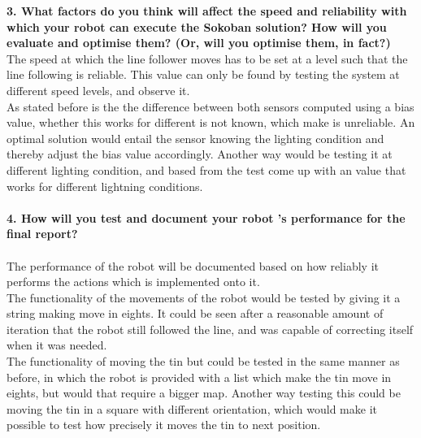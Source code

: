 \documentclass[10pt,a4paper]{article}
\begin{document}
\textbf{3.  What factors do you think will affect the speed and reliability with which your
     robot can execute the Sokoban solution?  How will you evaluate and optimise them?
     (Or, will you optimise them, in fact?)}\\
     

		The speed at which the line follower moves has to be set at a level such that the line following is reliable.   This value can only be found by testing the system at different speed levels, and observe it.\\
		
		As stated before is the the difference between both sensors computed using a bias value, whether this works for different is not known, which make is unreliable. An optimal solution would entail the sensor knowing the lighting condition and thereby adjust  the bias value accordingly.  Another way would be testing it at different lighting condition, and based from the test come up with an value that works for different lightning conditions. \\\\
		\textbf{4.  How will you test and document your robot
		's performance for the final report?}\\\\

The performance of the robot will be documented based on how reliably it performs the actions which is implemented onto it. \\


	The  functionality of the movements of the robot would be tested by giving it a string making move in eights.   It could be seen after a reasonable amount of iteration that the robot still followed the line, and was capable of correcting itself when   it was needed. \\
	
	The functionality of moving the tin but could be tested in the same manner as before, in which the robot is provided with a list which make the tin move in eights,  but would that require a bigger map. Another way testing this could be moving the tin in a square with different orientation, which would make it possible to test how precisely it moves the tin to next position. \\
	
	
	

	
	
\end{document}

